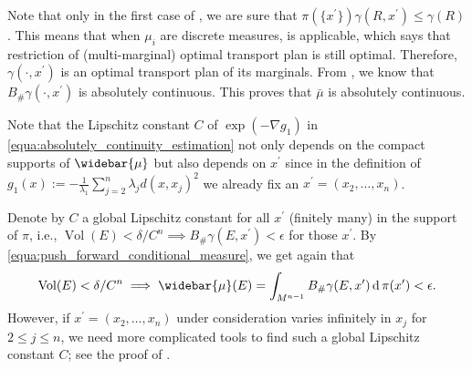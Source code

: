 Note that only in the first case of ,
we are sure that $\pi(\{x^\prime\}) \gamma(R, x^\prime) \leq \gamma(R)$.
This means that when $\mu_i$ are discrete measures,
 is applicable, which says that
restriction of (multi-marginal) optimal transport plan is still optimal.
Therefore, $\gamma(\cdot , x^\prime)$ is an optimal transport plan of its marginals.
From , we know that $B_{\#}\gamma(\cdot, x^\prime)$
is absolutely continuous.
This proves that $\bar{\mu}$ is absolutely continuous.

\begin{rmk}
	\label{rmk:global_Lipschitz_constant}
	Note that the Lipschitz constant $C$ of $\exp(-\nabla g_1)$
	in \cref{equa:absolutely_continuity_estimation}
	not only depends on the compact supports of $\widebar{\mu}$
	but also depends on $x^\prime$
	since in the definition of $g_1(x):=- \frac{1}{\lambda_1}\sum_{j=2}^n \lambda_j d(x, x_j)^2$
	we already fix an $x^\prime = (x_2, \ldots, x_n)$.

	Denote by $C$ a global Lipschitz constant for all $x^\prime$ (finitely many) in the support of $\pi$,
	i.e., $\operatorname{Vol}(E) < \delta /C^n \implies B_{\#} \gamma(E , x^\prime) < \epsilon$
	for those $x^\prime$.
	By \cref{equa:push_forward_conditional_measure}, we get again that
	\[
		\operatorname{Vol}(E) < \delta / C^n \implies \widebar{\mu}(E)
		= \int_{M^{n-1}} B_{\#}\gamma(E , x^\prime) \diff \pi(x^\prime) < \epsilon.
	\]
	However, if $x^\prime = (x_2, \ldots, x_n)$ under consideration varies infinitely
	in $x_j$ for $2 \leq j \leq n$,
	we need more complicated tools to find such a global Lipschitz constant $C$;
	see the proof of .
\end{rmk}
